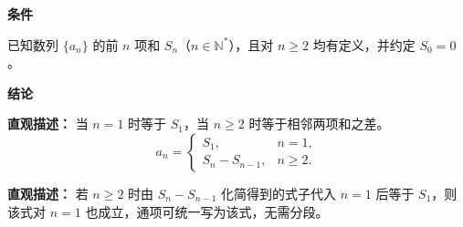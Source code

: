 \begin{statementbox}

	\textbf{\textcolor{CStatement}{条件}}
	\begin{description}[style=nextline, leftmargin=2.8em, labelsep=0.5em, itemsep=0.35em]
		\item[\textbf{\textcolor{CStatement}{条件 1（前n项和条件）：}}] 已知数列 $\{a_n\}$ 的前 $n$ 项和 $S_n$（$n\in\mathbb{N}^*$），且对 $n\ge 2$ 均有定义，并约定 $S_0=0$。
	\end{description}

	\textbf{\textcolor{CStatement}{结论}}
	\begin{description}[style=nextline, leftmargin=2.8em, labelsep=0.5em, itemsep=0.45em]
		\item[\textbf{\textcolor{CStatement}{结论一（分段通项公式）：}}]
			\textbf{\textcolor{CStatement}{直观描述：}}
			当 $n=1$ 时等于 $S_1$，当 $n\ge2$ 时等于相邻两项和之差。
			\[
				a_n=\begin{cases}
				S_1, & n=1,\\
				S_n-S_{n-1}, & n\ge 2.
		\end{cases}
		\]

	\item[\textbf{\textcolor{CStatement}{推广结论（统一条件判断）：}}]
		\textbf{\textcolor{CStatement}{直观描述：}}
		若 $n\ge2$ 时由 $S_n-S_{n-1}$ 化简得到的式子代入 $n=1$ 后等于 $S_1$，则该式对 $n=1$ 也成立，通项可统一写为该式，无需分段。
\end{description}

\end{statementbox}
